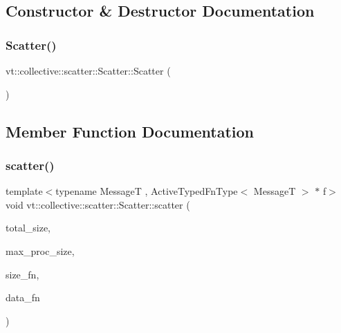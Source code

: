 \subsection{Constructor \& Destructor Documentation}
\mbox{\label{structvt_1_1collective_1_1scatter_1_1_scatter_a33ea9a78c5d43dcea4ec2cb69d8b00b4}} 
\subsubsection{\texorpdfstring{Scatter()}{Scatter()}}
{\footnotesize\ttfamily vt\+::collective\+::scatter\+::\+Scatter\+::\+Scatter (\begin{DoxyParamCaption}{ }\end{DoxyParamCaption})}



\subsection{Member Function Documentation}
\mbox{\label{structvt_1_1collective_1_1scatter_1_1_scatter_a0873f5fd4b890ad95e6ed6c097efe8bd}} 
\subsubsection{\texorpdfstring{scatter()}{scatter()}}
{\footnotesize\ttfamily template$<$typename MessageT , Active\+Typed\+Fn\+Type$<$ Message\+T $>$ $\ast$ f$>$ \\
void vt\+::collective\+::scatter\+::\+Scatter\+::scatter (\begin{DoxyParamCaption}\item[{std\+::size\+\_\+t const \&}]{total\+\_\+size,  }\item[{std\+::size\+\_\+t const \&}]{max\+\_\+proc\+\_\+size,  }\item[{\hyperlink{structvt_1_1collective_1_1scatter_1_1_scatter_a977d895e42999a4078c6705ac851f447}{Func\+Size\+Type}}]{size\+\_\+fn,  }\item[{\hyperlink{structvt_1_1collective_1_1scatter_1_1_scatter_a4040244e8ed36afd5d408c27efceea1b}{Func\+Data\+Type}}]{data\+\_\+fn }\end{DoxyParamCaption})}

